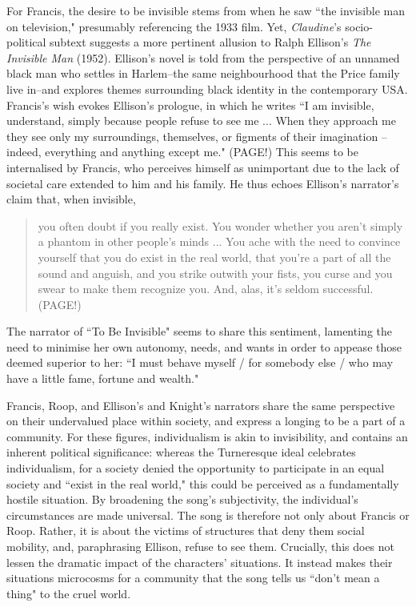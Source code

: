 For Francis, the desire to be invisible stems from when he saw ``the invisible man on television," presumably referencing the 1933 film.
Yet, \textit{Claudine}'s socio-political subtext suggests a more pertinent allusion to Ralph Ellison's \textit{The Invisible Man} (1952).
Ellison's novel is told from the perspective of an unnamed black man who settles in Harlem–the same neighbourhood that the Price family live in–and explores themes surrounding black identity in the contemporary USA.
Francis's wish evokes Ellison's prologue, in which he writes ``I am invisible, understand, simply because people refuse to see me ... When they approach me they see only my surroundings, themselves, or figments of their imagination – indeed, everything and anything except me." (PAGE!)
This seems to be internalised by Francis, who perceives himself as unimportant due to the lack of societal care extended to him and his family.
He thus echoes Ellison's narrator's claim that, when invisible, 
\begin{quote}
you often doubt if you really exist. You wonder whether you aren't simply a phantom in other people's minds ... You ache with the need to convince yourself that you do exist in the real world, that you're a part of all the sound and anguish, and you strike outwith your fists, you curse and you swear to make them recognize you. And, alas, it's seldom successful. (PAGE!)
\end{quote}
The narrator of ``To Be Invisible" seems to share this sentiment, lamenting the need to minimise her own autonomy, needs, and wants in order to appease those deemed superior to her: ``I must behave myself / for somebody else / who may have a little fame, fortune and wealth."

Francis, Roop, and Ellison's and Knight's narrators share the same perspective on their undervalued place within society, and express a longing to be a part of a community.
For these figures, individualism is akin to invisibility, and contains an inherent political significance:
whereas the Turneresque ideal celebrates individualism, for a society denied the opportunity to participate in an equal society and ``exist in the real world," this could be perceived as a fundamentally hostile situation.
By broadening the song's subjectivity, the individual's circumstances are made universal. 
The song is therefore not only about Francis or Roop.
Rather, it is about the victims of structures that deny them social mobility, and, paraphrasing Ellison, refuse to see them.
Crucially, this does not lessen the dramatic impact of the characters' situations.
It instead makes their situations microcosms for a community that the song tells us ``don't mean a thing" to the cruel world.


